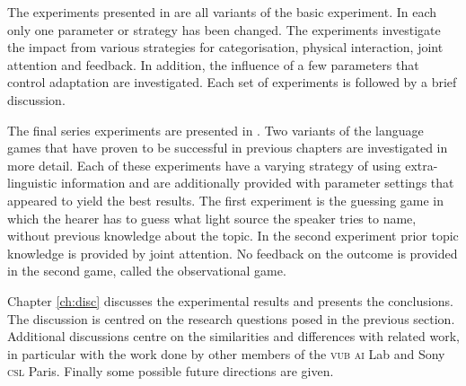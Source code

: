 The experiments presented in  are all variants of the basic experiment. In each only one parameter or strategy has been changed. The experiments investigate the impact from various strategies for categorisation, physical interaction, joint attention and feedback. In addition, the influence of a few parameters that control adaptation are investigated. Each set of experiments is followed by a brief discussion.

The final series experiments are presented in . Two variants of the language games that have proven to be successful in previous chapters are investigated in more detail. Each of these experiments have a varying strategy of using extra-linguistic information and are additionally provided with parameter settings that appeared to yield the best results. The first experiment is the {\sc guessing game} in which the hearer has to guess what light source the speaker tries to name, without previous knowledge about the topic. In the second experiment prior topic knowledge is provided by joint attention. No feedback on the outcome is provided in the second game, called the {\sc observational game}.


Chapter \ref{ch:disc} discusses the experimental results and presents the conclusions. The discussion is centred on the research questions posed in the previous section. Additional discussions centre on the similarities and differences with related work, in particular with the work done by other members of the {\scshape vub ai} Lab and Sony {\scshape csl} Paris. Finally some possible future directions are given.





